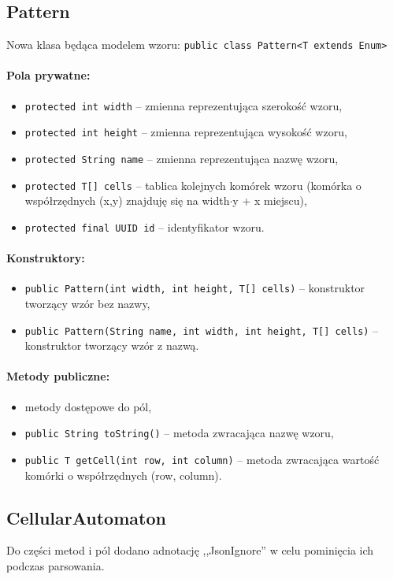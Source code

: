 \documentclass{mwart}
\begin{document}
\subsection{Pattern}
Nowa klasa będąca modelem wzoru:
\texttt{public class Pattern<T extends Enum>}
\paragraph{Pola prywatne:}
\begin{itemize}
	\item \texttt{protected int width} -- zmienna reprezentująca szerokość wzoru,
	\item \texttt{protected int height} -- zmienna reprezentująca wysokość wzoru,
	\item \texttt{protected String name} -- zmienna reprezentująca nazwę wzoru,
	\item \texttt{protected T[] cells} -- tablica kolejnych komórek wzoru (komórka o współrzędnych (x,y) znajduję się na width$\cdot$y + x miejscu),
	\item \texttt{protected final UUID id} -- identyfikator wzoru.
\end{itemize}

\paragraph{Konstruktory:}
\begin{itemize}
	\item \texttt{public Pattern(int width, int height, T[] cells)} -- konstruktor tworzący wzór bez nazwy,
	\item \texttt{public Pattern(String name, int width, int height, T[] cells)} -- konstruktor tworzący wzór z nazwą.
\end{itemize}

\paragraph{Metody publiczne:}
\begin{itemize}
		\item metody dostępowe do pól,
		\item \texttt{public String toString()} -- metoda zwracająca nazwę wzoru,
		\item \texttt{public T getCell(int row, int column)} -- metoda zwracająca wartość komórki o współrzędnych (row, column).
\end{itemize}

\subsection{CellularAutomaton}
Do części metod i pól dodano adnotację ,,JsonIgnore'' w celu pominięcia ich podczas parsowania.
\end{document}
